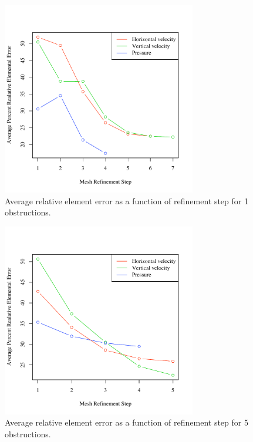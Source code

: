 \documentclass[wrr]{agutex}  %
\begin{document}
\begin{article}
\begin{figure}
\noindent\includegraphics[width=20pc]{../plots/errorstep_1.pdf}
\caption{Average relative element error as a function of refinement step for 1 obstructions.}\label{fig:err_1}
\end{figure}

\begin{figure}
\noindent\includegraphics[width=20pc]{../plots/errorstep_5.pdf}
\caption{Average relative element error as a function of refinement step for 5 obstructions.}\label{fig:err_5}
\end{figure}


\end{article}
\end{document}
